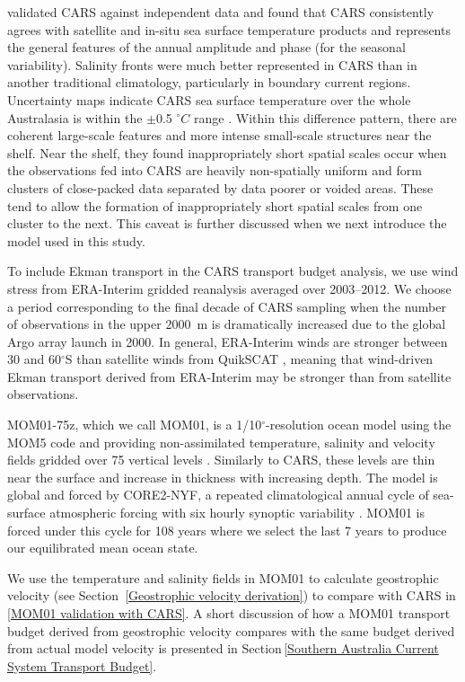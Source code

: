 \documentclass[preprint,3p,review,12pt]{elsarticle}
\newcommand{\dg}{$^{\circ}$}
\begin{document}
\citet{Ridgway2002} validated CARS against independent data and found that CARS consistently agrees with satellite and in-situ sea surface temperature products and represents the general features of the annual amplitude and phase (for the seasonal variability). Salinity fronts were much better represented in CARS than in another traditional climatology, particularly in boundary current regions. Uncertainty maps indicate CARS sea surface temperature over the whole Australasia is within the $\pm$0.5 $^{\circ}C$ range \citep{Ridgway2002}. Within this difference pattern, there are coherent large-scale features and more intense small-scale structures near the shelf. Near the shelf, they found inappropriately short spatial scales occur when the observations fed into CARS are heavily non-spatially uniform and form clusters of close-packed data separated by data poorer or voided areas. These tend to allow the formation of inappropriately short spatial scales from one cluster to the next. This caveat is further discussed when we next introduce the model used in this study.

To include Ekman transport in the CARS transport budget analysis, we use wind stress from ERA-Interim gridded reanalysis \citep{Dee2011} averaged over 2003--2012. We choose a period corresponding to the final decade of CARS sampling when the number of observations in the upper \SI{2000}{m} is dramatically increased due to the global Argo array launch in 2000. In general, ERA-Interim winds are stronger between 30 and 60\dg S than satellite winds from QuikSCAT \citep{Chaudhuri2013}, meaning that wind-driven Ekman transport derived from ERA-Interim may be stronger than from satellite observations.

MOM01-75z, which we call MOM01, is a 1/10\dg-resolution ocean model using the MOM5 code \citep{Griffies2012} and providing non-assimilated temperature, salinity and velocity fields gridded over 75 vertical levels \citep{Stewart2017}. Similarly to CARS, these levels are thin near the surface and increase in thickness with increasing depth.
The model is global and forced by CORE2-NYF, a repeated climatological annual cycle of sea-surface atmospheric forcing with six hourly synoptic variability \citep{Large2009}.
MOM01 is forced under this cycle for 108 years where we select the last 7 years to produce our equilibrated mean ocean state.

We use the temperature and salinity fields in MOM01 to calculate geostrophic velocity (see Section~\ref{Geostrophic velocity derivation}) to compare with CARS in \ref{MOM01 validation with CARS}. A short discussion of how a MOM01 transport budget derived from geostrophic velocity compares with the same budget derived from actual model velocity is presented in Section\,\ref{Southern Australia Current System Transport Budget}.
\end{document}
